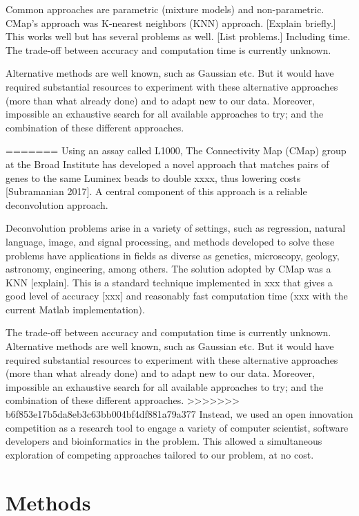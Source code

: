 \documentclass[]{article}
\begin{document}
Common approaches are parametric (mixture models) and non-parametric.
CMap's approach was K-nearest neighbors (KNN) approach. {[}Explain
briefly.{]} This works well but has several problems as well. {[}List
problems.{]} Including time. The trade-off between accuracy and
computation time is currently unknown.

Alternative methods are well known, such as Gaussian etc. But it would
have required substantial resources to experiment with these alternative
approaches (more than what already done) and to adapt new to our data.
Moreover, impossible an exhaustive search for all available approaches
to try; and the combination of these different approaches.

=======
Using an assay called L1000, The Connectivity Map (CMap) group at the
Broad Institute has developed a novel approach that matches pairs of
genes to the same Luminex beads to double xxxx, thus lowering costs
{[}Subramanian 2017{]}. A central component of this approach is a
reliable deconvolution approach.

Deconvolution problems arise in a variety of settings, such as
regression, natural language, image, and signal processing, and methods
developed to solve these problems have applications in fields as diverse
as genetics, microscopy, geology, astronomy, engineering, among others.
The solution adopted by CMap was a KNN {[}explain{]}. This is a standard
technique implemented in xxx that gives a good level of accuracy
{[}xxx{]} and reasonably fast computation time (xxx with the current
Matlab implementation).

The trade-off between accuracy and computation time is currently
unknown. Alternative methods are well known, such as Gaussian etc. But
it would have required substantial resources to experiment with these
alternative approaches (more than what already done) and to adapt new to
our data. Moreover, impossible an exhaustive search for all available
approaches to try; and the combination of these different approaches.
>>>>>>> b6f853e17b5da8eb3c63bb004bf4df881a79a377
Instead, we used an open innovation competition as a research tool to
engage a variety of computer scientist, software developers and
bioinformatics in the problem. This allowed a simultaneous exploration
of competing approaches tailored to our problem, at no cost.

\hypertarget{methods}{%
\section{Methods}\label{methods}}
\end{document}
